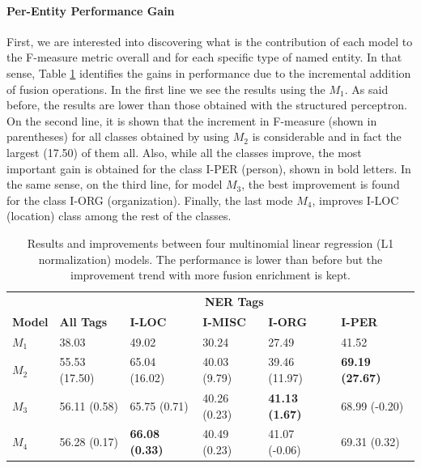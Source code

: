 \paragraph{Per-Entity Performance Gain}
First, we are interested into discovering what is the contribution of each model to  the F-measure metric overall and for each specific type of named entity. In that sense,  Table \ref{tab:4ops} identifies the gains in performance due to the incremental addition of  fusion operations. In the first line  we see the results using the $M_1$. As said before, the results are lower than those obtained with the structured perceptron. On the second line, it is shown that the increment in F-measure (shown in parentheses) for all classes obtained by using $M_2$ is considerable and in fact the largest (17.50) of them all. Also, while all the classes improve, the most important gain is obtained for the class I-PER (person), shown in bold letters. In the same sense, on the third line, for model $M_3$, the best improvement is found for the class I-ORG (organization). Finally, the last mode $M_4$, improves I-LOC (location) class among the rest of the classes.




\begin{table}[]
\centering
\caption{Results and improvements between four multinomial linear regression (L1 normalization) models. The performance is lower than before but the improvement trend with more fusion enrichment is kept.   }
\label{tab:4ops}
\begin{tabular}{@{}llllll@{}}
\toprule
& \multicolumn{5}{c}{\textbf{NER Tags}} \\ \cline{2-6}
 \textbf{Model} & \textbf{All Tags}           & \textbf{I-LOC}                   & \textbf{I-MISC}         & \textbf{I-ORG}                   & \textbf{I-PER}                    \\ \midrule
$M_1$ & 38.03         & 49.02                 & 30.24        & 27.49                 & 41.52                  \\
$M_2$ & 55.53 (17.50) & 65.04 (16.02)         & 40.03 (9.79) & 39.46 (11.97)         & \textbf{69.19 (27.67)} \\
$M_3$ & 56.11 (0.58)  & 65.75 (0.71)          & 40.26 (0.23) & \textbf{41.13 (1.67)} & 68.99 (-0.20)          \\
$M_4$& 56.28 (0.17)  & \textbf{66.08 (0.33)} & 40.49 (0.23) & 41.07 (-0.06)         & 69.31 (0.32)           \\ \bottomrule
\end{tabular}
\end{table}

